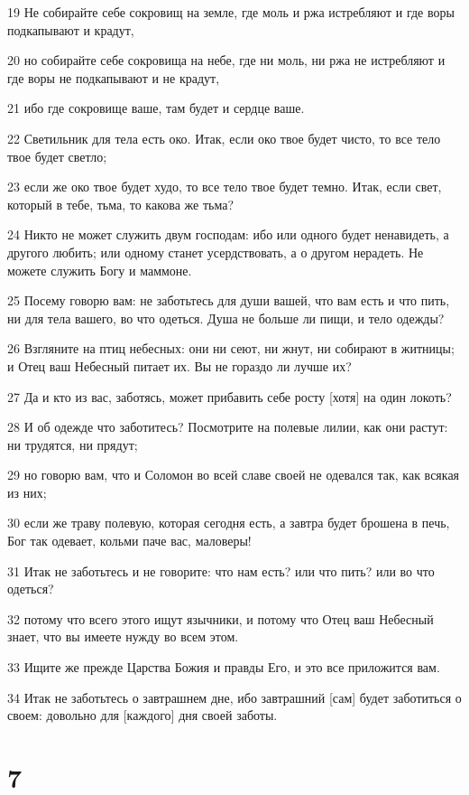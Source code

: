 \par 19 Не собирайте себе сокровищ на земле, где моль и ржа истребляют и где воры подкапывают и крадут,
\par 20 но собирайте себе сокровища на небе, где ни моль, ни ржа не истребляют и где воры не подкапывают и не крадут,
\par 21 ибо где сокровище ваше, там будет и сердце ваше.
\par 22 Светильник для тела есть око. Итак, если око твое будет чисто, то все тело твое будет светло;
\par 23 если же око твое будет худо, то все тело твое будет темно. Итак, если свет, который в тебе, тьма, то какова же тьма?
\par 24 Никто не может служить двум господам: ибо или одного будет ненавидеть, а другого любить; или одному станет усердствовать, а о другом нерадеть. Не можете служить Богу и маммоне.
\par 25 Посему говорю вам: не заботьтесь для души вашей, что вам есть и что пить, ни для тела вашего, во что одеться. Душа не больше ли пищи, и тело одежды?
\par 26 Взгляните на птиц небесных: они ни сеют, ни жнут, ни собирают в житницы; и Отец ваш Небесный питает их. Вы не гораздо ли лучше их?
\par 27 Да и кто из вас, заботясь, может прибавить себе росту [хотя] на один локоть?
\par 28 И об одежде что заботитесь? Посмотрите на полевые лилии, как они растут: ни трудятся, ни прядут;
\par 29 но говорю вам, что и Соломон во всей славе своей не одевался так, как всякая из них;
\par 30 если же траву полевую, которая сегодня есть, а завтра будет брошена в печь, Бог так одевает, кольми паче вас, маловеры!
\par 31 Итак не заботьтесь и не говорите: что нам есть? или что пить? или во что одеться?
\par 32 потому что всего этого ищут язычники, и потому что Отец ваш Небесный знает, что вы имеете нужду во всем этом.
\par 33 Ищите же прежде Царства Божия и правды Его, и это все приложится вам.
\par 34 Итак не заботьтесь о завтрашнем дне, ибо завтрашний [сам] будет заботиться о своем: довольно для [каждого] дня своей заботы.

\chapter{7}


